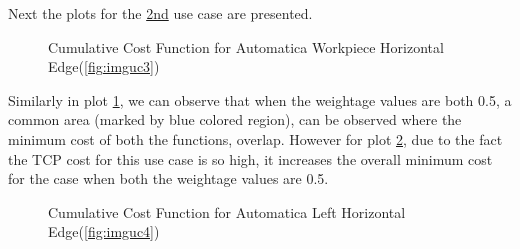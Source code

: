 Next the plots for the \hyperref[fig:uc2]{2nd} use case are presented. 
\begin{figure}[!ht] %
	\centering
	\caption{Cumulative Cost Function for Automatica Workpiece Horizontal Edge(\ref{fig:imguc3})}
	\label{fig:tot3}
\end{figure}
Similarly in plot \ref{fig:tot3}, we can observe that when the weightage values are both 0.5, a common area (marked by blue colored region), can be observed where the minimum cost of both the functions, overlap. However for plot \ref{fig:tot4}, due to the fact the TCP cost for this use case is so high, it increases the overall minimum cost for the case when both the weightage values are 0.5. 

\begin{figure}[!ht] %
	\centering
	\caption{Cumulative Cost Function for Automatica Left Horizontal Edge(\ref{fig:imguc4})}
	\label{fig:tot4}
\end{figure}
\clearpage

